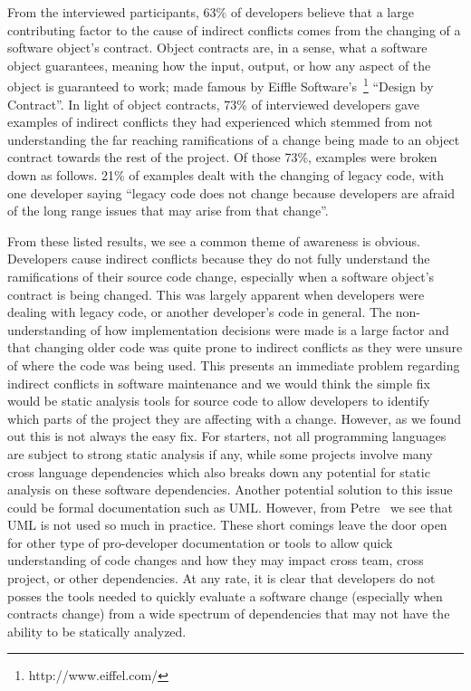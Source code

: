 \documentclass[conference]{IEEEtran}
\begin{document}
From the interviewed participants, 63\% of developers believe that a large contributing factor to the cause
of indirect conflicts comes from the changing of a software object's contract. Object contracts are, in a sense,
what a software object guarantees, meaning how the input, output, or how any aspect of the object is guaranteed
to work; made famous by Eiffle Software's~\footnote{http://www.eiffel.com/} ``Design by Contract''\texttrademark. 
In light of object contracts, 73\% of interviewed developers gave examples of indirect conflicts they had experienced
which stemmed from not understanding the far reaching ramifications of a change being made to an object contract
towards the rest of the project. Of those 73\%, examples were broken down as follows. 21\% of examples dealt
with the changing of legacy code, with one developer saying ``legacy code does not change because developers 
are afraid of the long range issues that may arise from that change''.

From these listed results, we see a common theme of awareness is obvious. Developers cause indirect conflicts because they do not
fully understand the ramifications of their source code change, especially when a software object's contract is being changed. 
This was largely apparent when developers were dealing with legacy code,
or another developer's code in general. The non-understanding of how implementation decisions were made is a large factor and that changing
older code was quite prone to indirect conflicts as they were unsure of where the code was being used. This presents an immediate problem regarding
indirect conflicts in software maintenance and we would think the simple fix would be static analysis tools for source
code to allow developers to identify which parts of the project they are affecting with a change. However, as we found out this is not always
the easy fix. For starters, not all programming languages are subject to strong static analysis if any, while some projects involve many
cross language dependencies which also breaks down any potential for static analysis on these software dependencies. Another potential solution
to this issue could be formal documentation such as UML. However, from Petre~\cite{Petre:2013:UP} we see that UML is not used so much in practice.
These short comings leave the door open for other type of pro-developer documentation or tools to allow quick understanding of code changes and
how they may impact cross team, cross project, or other dependencies. At any rate, it is clear that developers do not posses the tools needed
to quickly evaluate a software change (especially when contracts change) from a wide spectrum of dependencies that may not have the ability to
be statically analyzed.
\end{document}
